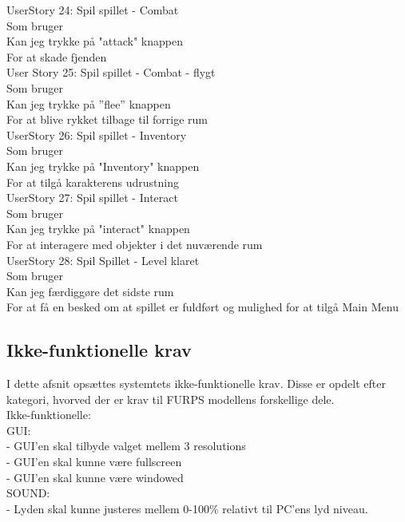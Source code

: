 UserStory 24: Spil spillet - Combat\\
  Som bruger\\
  Kan jeg trykke på "attack" knappen\\
  For at skade fjenden\\

User Story 25: Spil spillet - Combat - flygt\\
Som bruger\\
Kan jeg trykke på ”flee” knappen\\
For at blive rykket tilbage til forrige rum\\
  
UserStory 26: Spil spillet - Inventory\\
  Som bruger\\
  Kan jeg trykke på "Inventory" knappen\\
  For at tilgå karakterens udrustning\\
  
UserStory 27: Spil spillet - Interact\\
  Som bruger\\
  Kan jeg trykke på "interact" knappen\\
  For at interagere med objekter i det nuværende rum\\
  
UserStory 28: Spil Spillet - Level klaret\\
  Som bruger\\
  Kan jeg færdiggøre det sidste rum\\
  For at få en besked om at spillet er fuldført og mulighed for at tilgå Main Menu\\

\subsection{Ikke-funktionelle krav}
I dette afsnit opsættes systemtets ikke-funktionelle krav. Disse er opdelt efter kategori, hvorved der er krav til FURPS modellens forskellige dele.\\
Ikke-funktionelle:\\
  GUI:\\
    - GUI'en skal tilbyde valget mellem 3 resolutions\\
    - GUI'en skal kunne være fullscreen\\
    - GUI'en skal kunne være windowed\\

  SOUND:\\
    - Lyden skal kunne justeres mellem 0-100\% relativt til PC'ens lyd niveau.\\


